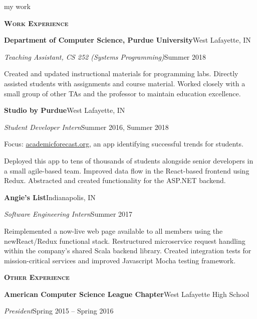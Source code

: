 \documentclass[11pt]{article}
\newcommand{\sectionfont}{\Large\scshape\bfseries\color{cg505green}}
\newcommand{\impact}[1]{\textcolor{cg505green}{\nohyphens{#1}}}
\begin{document}
\begin{minipage}[t]{0.67\textwidth}
  {\Huge\color{black} my work \phantom{me}}

  \vspace{5pt}

  {\sectionfont Work Experience}

  \textbf{Department of Computer Science, Purdue University}\hfill West Lafayette, IN
  \begin{adjustwidth}{10pt}{}
    \emph{Teaching Assistant, CS 252 (Systems Programming)}\hfill Summer 2018

    Created and updated instructional materials for programming labs.
    \impact{Directly assisted} students with assignments and course material.
    Worked closely with a small group of other TAs and the professor to maintain education excellence.
  \end{adjustwidth}

  \textbf{Studio by Purdue}\hfill West Lafayette, IN
  \begin{adjustwidth}{10pt}{}
    \emph{Student Developer Intern}\hfill Summer 2016, Summer 2018

    Focus: \href{https://academicforecast.org/about/}{academicforecast.org}, an app identifying successful trends for students.

    \impact{Deployed this app to tens of thousands} of students alongside senior developers in a small agile-based team.
    Improved data flow in the React-based frontend using Redux.
    Abstracted and created functionality for the ASP.NET backend.
  \end{adjustwidth}

  \textbf{Angie's List}\hfill Indianapolis, IN
  \begin{adjustwidth}{10pt}{}
    \emph{Software Engineering Intern}\hfill Summer 2017

    Reimplemented a \impact{now-live web page} available to all members using the new\break React/Redux functional stack.
    Restructured \impact{microservice request handling} within the company's shared Scala backend library.
    Created integration tests for mission-critical services and improved Javascript Mocha testing framework.
  \end{adjustwidth}

  \vspace{5pt}

  {\sectionfont Other Experience}

  \textbf{American Computer Science League Chapter}\hfill West Lafayette High School
  \begin{adjustwidth}{10pt}{}
    \emph{President}\hfill Spring 2015 -- Spring 2016


\end{adjustwidth}
\end{minipage}
\end{document}
